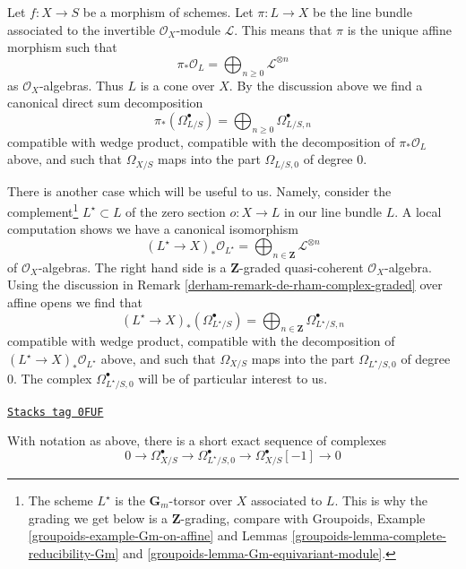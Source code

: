 \medskip\noindent
Let $f : X \to S$ be a morphism of schemes. Let $\pi : L \to X$ be the
line bundle associated to the invertible $\mathcal{O}_X$-module $\mathcal{L}$.
This means that $\pi$ is the unique affine morphism such that
$$
\pi_*\mathcal{O}_L =
\bigoplus\nolimits_{n \geq 0} \mathcal{L}^{\otimes n}
$$
as $\mathcal{O}_X$-algebras. Thus $L$ is a cone over $X$.
By the discussion above we find a
canonical direct sum decomposition
$$
\pi_*(\Omega^\bullet_{L/S}) =
\bigoplus\nolimits_{n \geq 0} \Omega^\bullet_{L/S, n}
$$
compatible with wedge product, compatible with the decomposition
of $\pi_*\mathcal{O}_L$ above, and such that $\Omega_{X/S}$
maps into the part $\Omega_{L/S, 0}$ of degree $0$.

\medskip\noindent
There is another case which will be useful to us. Namely, consider the
complement\footnote{The scheme $L^\star$ is the $\mathbf{G}_m$-torsor
over $X$ associated to $L$. This is why the grading we get below is
a $\mathbf{Z}$-grading, compare with Groupoids,
Example \ref{groupoids-example-Gm-on-affine} and
Lemmas \ref{groupoids-lemma-complete-reducibility-Gm} and
\ref{groupoids-lemma-Gm-equivariant-module}.}
$L^\star \subset L$ of the zero section $o : X \to L$ in our line
bundle $L$. A local computation shows we have a canonical isomorphism
$$
(L^\star \to X)_*\mathcal{O}_{L^\star} =
\bigoplus\nolimits_{n \in \mathbf{Z}} \mathcal{L}^{\otimes n}
$$
of $\mathcal{O}_X$-algebras. The right hand side is a $\mathbf{Z}$-graded
quasi-coherent $\mathcal{O}_X$-algebra. Using the discussion in
Remark \ref{derham-remark-de-rham-complex-graded} over affine opens we find that
$$
(L^\star \to X)_*(\Omega^\bullet_{L^\star/S}) =
\bigoplus\nolimits_{n \in \mathbf{Z}} \Omega^\bullet_{L^\star/S, n}
$$
compatible with wedge product, compatible with the decomposition
of $(L^\star \to X)_*\mathcal{O}_{L^\star}$ above, and such that
$\Omega_{X/S}$ maps into the part $\Omega_{L^\star/S, 0}$ of degree $0$.
The complex $\Omega^\bullet_{L^\star/S, 0}$ will be
of particular interest to us.

\begin{lemma}
\label{derham-lemma-the-complex-for-L-star}
\href{https://stacks.math.columbia.edu/tag/0FUF}{\texttt{Stacks tag 0FUF}}

With notation as above, there is a short exact sequence of complexes
$$
0 \to \Omega^\bullet_{X/S} \to
\Omega^\bullet_{L^\star/S, 0} \to
\Omega^\bullet_{X/S}[-1] \to 0
$$
\end{lemma}

